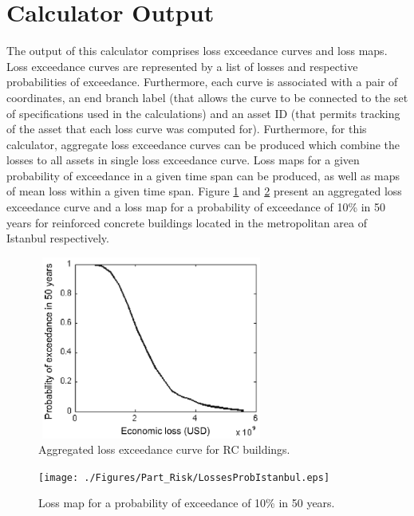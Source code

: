 \section{Calculator Output}
The output of this calculator comprises loss exceedance curves and loss maps. Loss exceedance curves are represented by a list of losses and respective probabilities of exceedance. Furthermore, each curve is associated with a pair of coordinates, an end branch label (that allows the curve to be connected to the set of specifications used in the calculations) and an asset ID (that permits tracking of the asset that each loss curve was computed for). Furthermore, for this calculator, aggregate loss exceedance curves can be produced which combine the losses to all assets in single loss exceedance curve.  Loss maps for a given probability of exceedance in a given time span can be produced, as well as maps of mean loss within a given time span. Figure \ref{fig:LossCurve} and \ref{fig:ProbLosses} present an aggregated loss exceedance curve and a loss map for a probability of exceedance of 10\% in 50 years for reinforced concrete buildings located in the metropolitan area of Istanbul respectively. 
\begin{figure}[ht]
\centering
\includegraphics[width=7.5cm,height=6cm]{./Figures/Part_Risk/LossCurveIstanbul.eps} 
\caption{Aggregated loss exceedance curve for RC buildings.}
\label{fig:LossCurve}
\end{figure} 
 \begin{figure}[ht]
\centering
\texttt{[image: ./Figures/Part\_Risk/LossesProbIstanbul.eps]}
\caption{Loss map for a probability of exceedance of 10\% in 50 years.}
\label{fig:ProbLosses}
\end{figure} 
